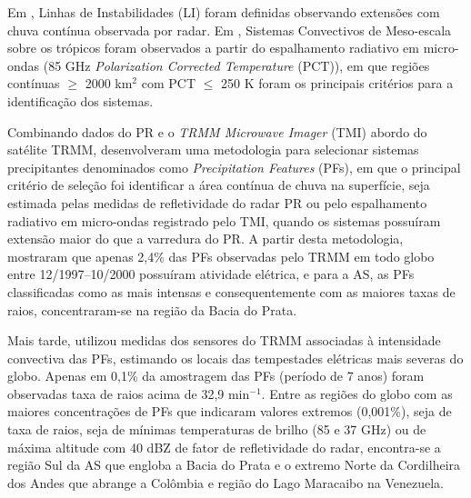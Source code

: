 Em , Linhas de Instabilidades (LI) foram definidas observando extensões com chuva contínua observada por radar. Em , Sistemas Convectivos de Meso-escala sobre os trópicos foram observados a partir do espalhamento radiativo em micro-ondas (85 GHz  \textit{Polarization Corrected Temperature} (PCT)), em que regiões contínuas $\geqslant$ 2000 km$^2$ com PCT $\leqslant$ 250 K foram os principais critérios para a identificação dos sistemas.


Combinando dados do PR e o \textit{TRMM Microwave Imager} (TMI) abordo do satélite TRMM,  desenvolveram uma metodologia para selecionar sistemas precipitantes denominados como \textit{Precipitation Features} (PFs), em que o principal critério de seleção foi identificar a área contínua de chuva na superfície, seja estimada pelas medidas de refletividade do radar PR ou pelo espalhamento radiativo em micro-ondas registrado pelo TMI, quando os sistemas possuíram extensão maior do que a varredura do PR. A partir desta metodologia,  mostraram que apenas 2,4\% das PFs observadas pelo TRMM em todo globo entre 12/1997--10/2000 possuíram atividade elétrica, e para a AS, as PFs classificadas como as mais intensas e consequentemente com as maiores taxas de raios, concentraram-se na região da Bacia do Prata.%


Mais tarde,  utilizou medidas dos sensores do TRMM associadas à intensidade convectiva das PFs, estimando os locais das tempestades elétricas mais severas do globo. Apenas em 0,1\% da amostragem das PFs (período de 7 anos) foram observadas taxa de raios acima de 32,9 min$^{-1}$.  Entre as regiões do globo com as maiores concentrações de PFs que indicaram valores extremos (0,001\%), seja de taxa de raios, seja de mínimas temperaturas de brilho (85 e 37 GHz) ou de máxima altitude com 40 dBZ de fator de refletividade do radar, encontra-se a região Sul da AS que engloba a Bacia do Prata e o extremo Norte da Cordilheira dos Andes que abrange a Colômbia e região do Lago Maracaibo na Venezuela. 

